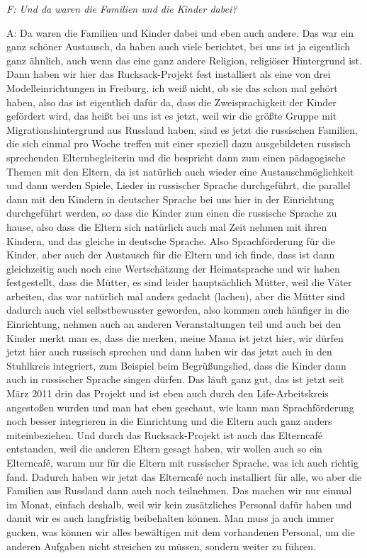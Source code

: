 \emph{F: Und da waren die Familien und die Kinder dabei?}

A: Da waren die Familien und Kinder dabei und eben auch andere. Das war ein ganz schöner Austausch, da haben auch viele berichtet, bei uns ist ja eigentlich ganz ähnlich, auch wenn das eine ganz andere Religion, religiöser Hintergrund ist. Dann haben wir hier das Rucksack-Projekt fest installiert als eine von drei Modelleinrichtungen in Freiburg, ich weiß nicht, ob sie das schon mal gehört haben, also das ist eigentlich dafür da, dass die Zweisprachigkeit der Kinder gefördert wird, das heißt bei uns ist es jetzt, weil wir die größte Gruppe mit Migrationshintergrund aus Russland haben, sind es jetzt die russischen Familien, die sich einmal pro Woche treffen mit einer speziell dazu ausgebildeten russisch sprechenden Elternbegleiterin und die bespricht dann zum einen pädagogische Themen mit den Eltern, da ist natürlich auch wieder eine Austauschmöglichkeit und dann werden Spiele, Lieder in russischer Sprache durchgeführt, die parallel dann mit den Kindern in deutscher Sprache bei uns hier in der Einrichtung durchgeführt werden, so dass die Kinder zum einen die russische Sprache zu hause, also dass die Eltern sich natürlich auch mal Zeit nehmen mit ihren Kindern, und das gleiche in deutsche Sprache. Also Sprachförderung für die Kinder, aber auch der Austausch für die Eltern und ich finde, dass ist dann gleichzeitig auch noch eine Wertschätzung der Heimatsprache und wir haben festgestellt, dass die Mütter, es sind leider hauptsächlich Mütter, weil die Väter arbeiten, das war natürlich mal anders gedacht (lachen), aber die Mütter sind dadurch auch viel selbstbewusster geworden, also kommen auch häufiger in die Einrichtung, nehmen auch an anderen Veranstaltungen teil und auch bei den Kinder merkt man es, dass die merken, meine Mama ist jetzt hier, wir dürfen jetzt hier auch russisch sprechen und dann haben wir das jetzt auch in den Stuhlkreis integriert, zum Beispiel beim Begrüßungslied, dass die Kinder dann auch in russischer Sprache singen dürfen. Das läuft ganz gut, das ist jetzt seit März 2011 drin das Projekt und ist eben auch durch den Life-Arbeitskreis angestoßen wurden und man hat eben geschaut, wie kann man Sprachförderung noch besser integrieren in die Einrichtung und die Eltern auch ganz anders miteinbeziehen. Und durch das Rucksack-Projekt ist auch das Elterncafé entstanden, weil die anderen Eltern gesagt haben, wir wollen auch so ein Elterncafé, warum nur für die Eltern mit russischer Sprache, was ich auch richtig fand. Dadurch haben wir jetzt das Elterncafé noch installiert für alle, wo aber die Familien aus Russland dann auch noch teilnehmen. Das machen wir nur einmal im Monat, einfach deshalb, weil wir kein zusätzliches Personal dafür haben und damit wir es auch langfristig beibehalten können. Man muss ja auch immer gucken, was können wir alles bewältigen mit dem vorhandenen Personal, um die anderen Aufgaben nicht streichen zu müssen, sondern weiter zu führen. 

